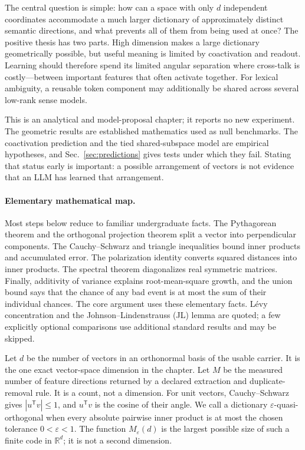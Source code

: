 \documentclass[
  aps,
  reprint,
  superscriptaddress,
  floatfix,
  nofootinbib,
  longbibliography
]{revtex4-2}
\newcommand{\R}{\mathbb{R}}
\newcommand{\Msem}{M}
\newcommand{\T}{^{\mathsf{T}}}
\begin{document}
The central question is simple: how can a space with only $d$ independent
coordinates accommodate a much larger dictionary of approximately distinct
semantic directions, and what prevents all of them from being used at once?
The positive thesis has two parts.  High dimension makes a large dictionary
geometrically possible, but useful meaning is limited by coactivation and
readout.  Learning should therefore spend its limited angular separation where
cross-talk is costly---between important features that often activate
together.  For lexical ambiguity, a reusable token component may additionally
be shared across several low-rank sense models.

This is an analytical and model-proposal chapter; it reports no new experiment.
The geometric results are established mathematics used as null benchmarks.
The coactivation prediction and the tied shared-subspace model are empirical
hypotheses, and Sec.~\ref{sec:predictions} gives tests under which they fail.
Stating that status early is important: a possible arrangement of vectors is
not evidence that an LLM has learned that arrangement.

\paragraph{Elementary mathematical map.}
Most steps below reduce to familiar undergraduate facts.  The Pythagorean
theorem and the orthogonal projection theorem split a vector into perpendicular
components.  The Cauchy--Schwarz and triangle inequalities bound inner products
and accumulated error.  The polarization identity converts squared distances
into inner products.  The spectral theorem diagonalizes real symmetric
matrices.  Finally, additivity of variance explains root-mean-square growth,
and the union bound says that the chance of any bad event is at most the sum of
their individual chances.  The core argument uses these elementary facts.
L\'evy concentration and the Johnson--Lindenstrauss (JL) lemma are quoted;
a few explicitly optional comparisons use additional standard results and may
be skipped.

Let $d$ be the number of vectors in an orthonormal basis of the usable carrier.
It is the one exact vector-space dimension in the chapter.  Let $\Msem$ be the
measured number of feature directions returned by a declared extraction and
duplicate-removal rule.  It is a count, not a dimension.  For unit vectors,
Cauchy--Schwarz gives $|u\T v|\leq1$, and $u\T v$ is the cosine of their angle.
We call a dictionary $\varepsilon$-quasi-orthogonal when every absolute
pairwise inner product is at most the chosen tolerance
$0<\varepsilon<1$.  The function $M_\varepsilon(d)$ is the largest possible
size of such a finite code in $\R^d$; it is not a second dimension.
\end{document}
